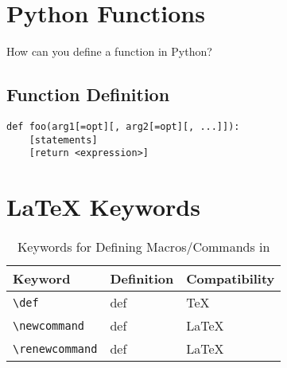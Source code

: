 \documentclass{article}
\title{\docTitle}
\author{}
\date{}
\newcommand{\goldenRatio}[0]{%
    (\sqrt{5} + 1) / 2}
\newcommand{\maxTableWidth}[0]{%
    (\textwidth{} * \goldenRatio{}) + (\textwidth{} / \goldenRatio{}) * 2}
\begin{document}
\begin{titlepage}
\maketitle
\thispagestyle{empty}
\tableofcontents
\end{titlepage}

\newpage
\section{Python Functions}
How can you define a function in Python?

\subsection{Function Definition}
\begin{verbatim}
def foo(arg1[=opt][, arg2[=opt][, ...]]):
    [statements]
    [return <expression>]
\end{verbatim}

\section{\LaTeX{} Keywords}
{\renewcommand{\tabcolsep}{0em}
\renewcommand{\arraystretch}{1.4}
\begin{table}[!ht]
\begin{tabular}{p{} @{} p{} @{} p{}}
Keyword                                 &
\multicolumn{1}{l}{Definition}          &
\multicolumn{1}{l}{Compatibility}       \\
\hline
\texttt{\textbackslash{}def}            &       def     &       \TeX{}          \\
\texttt{\textbackslash{}newcommand}     &       def     &       \LaTeX{}        \\
\texttt{\textbackslash{}renewcommand}   &       def     &       \LaTeX{}
\end{tabular}
\caption{Keywords for Defining Macros/Commands in \LaTeXe{}}
\end{table}}


\printindex
\end{document}
